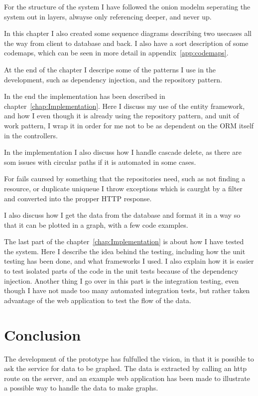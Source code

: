 For the structure of the system I have followed the onion modelm seperating the
system out in layers, alwayse only referencing deeper, and never up.

In this chapter I also created some sequence diagrams describing two usecases
all the way from client to database and back. I also have a sort description of
some codemaps, which can be seen in more detail in appendix~\ref{app:codemaps}.

At the end of the chapter I descripe some of the patterns I use in the
development, such as dependency injection, and the repository pattern.

In the end the implementation has been described in
chapter~\ref{chap:Implementation}. Here I discuss my use of the entity
framework, and how I even though it is already using the repository pattern, and
unit of work pattern, I wrap it in order for me not to be as dependent on the
ORM itself in the controllers.

In the implementation I also discuss how I handle cascade delete, as there are
som issues with circular paths if it is automated in some cases.

For fails caursed by something that the repositories need, such as not finding a
resource, or duplicate uniqueue I throw exceptions which is caurght by a filter
and converted into the propper HTTP response.

I also discuss how I get the data from the database and format it in a way so
that it can be plotted in a graph, with a few code examples.

The last part of the chapter~\ref{chap:Implementation} is about how I have
tested the system. Here I describe the idea behind the testing, including how
the unit testing has been done, and what frameworks I used. I also explain how
it is easier to test isolated parts of the code in the unit tests because of the
dependency injection. Another thing I go over in this part is the integration
testing, even though I have not made too many automated integration tests, but
rather taken advantage of the web application to test the flow of the data.

\section{Conclusion}
The development of the prototype has fulfulled the vision, in that it is
possible to ask the service for data to be graphed. The data is extracted by
calling an http route on the server, and an example web application has been
made to illustrate a possible way to handle the data to make graphs.


